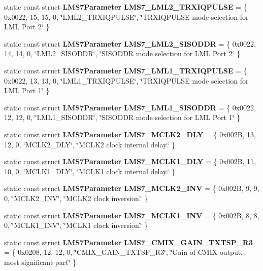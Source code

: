 \begin{DoxyCompactItemize}
\item 
static const struct {\bf L\+M\+S7\+Parameter} {\bf L\+M\+S7\+\_\+\+L\+M\+L2\+\_\+\+T\+R\+X\+I\+Q\+P\+U\+L\+SE} = \{ 0x0022, 15, 15, 0, \char`\"{}\+L\+M\+L2\+\_\+\+T\+R\+X\+I\+Q\+P\+U\+L\+S\+E\char`\"{}, \char`\"{}\+T\+R\+X\+I\+Q\+P\+U\+L\+S\+E mode selection for L\+M\+L Port 2\char`\"{} \}
\item 
static const struct {\bf L\+M\+S7\+Parameter} {\bf L\+M\+S7\+\_\+\+L\+M\+L2\+\_\+\+S\+I\+S\+O\+D\+DR} = \{ 0x0022, 14, 14, 0, \char`\"{}\+L\+M\+L2\+\_\+\+S\+I\+S\+O\+D\+D\+R\char`\"{}, \char`\"{}\+S\+I\+S\+O\+D\+D\+R mode selection for L\+M\+L Port 2\char`\"{} \}
\item 
static const struct {\bf L\+M\+S7\+Parameter} {\bf L\+M\+S7\+\_\+\+L\+M\+L1\+\_\+\+T\+R\+X\+I\+Q\+P\+U\+L\+SE} = \{ 0x0022, 13, 13, 0, \char`\"{}\+L\+M\+L1\+\_\+\+T\+R\+X\+I\+Q\+P\+U\+L\+S\+E\char`\"{}, \char`\"{}\+T\+R\+X\+I\+Q\+P\+U\+L\+S\+E mode selection for L\+M\+L Port 1\char`\"{} \}
\item 
static const struct {\bf L\+M\+S7\+Parameter} {\bf L\+M\+S7\+\_\+\+L\+M\+L1\+\_\+\+S\+I\+S\+O\+D\+DR} = \{ 0x0022, 12, 12, 0, \char`\"{}\+L\+M\+L1\+\_\+\+S\+I\+S\+O\+D\+D\+R\char`\"{}, \char`\"{}\+S\+I\+S\+O\+D\+D\+R mode selection for L\+M\+L Port 1\char`\"{} \}
\item 
static const struct {\bf L\+M\+S7\+Parameter} {\bf L\+M\+S7\+\_\+\+M\+C\+L\+K2\+\_\+\+D\+LY} = \{ 0x002\+B, 13, 12, 0, \char`\"{}\+M\+C\+L\+K2\+\_\+\+D\+L\+Y\char`\"{}, \char`\"{}\+M\+C\+L\+K2 clock internal delay.\char`\"{} \}
\item 
static const struct {\bf L\+M\+S7\+Parameter} {\bf L\+M\+S7\+\_\+\+M\+C\+L\+K1\+\_\+\+D\+LY} = \{ 0x002\+B, 11, 10, 0, \char`\"{}\+M\+C\+L\+K1\+\_\+\+D\+L\+Y\char`\"{}, \char`\"{}\+M\+C\+L\+K1 clock internal delay.\char`\"{} \}
\item 
static const struct {\bf L\+M\+S7\+Parameter} {\bf L\+M\+S7\+\_\+\+M\+C\+L\+K2\+\_\+\+I\+NV} = \{ 0x002\+B, 9, 9, 0, \char`\"{}\+M\+C\+L\+K2\+\_\+\+I\+N\+V\char`\"{}, \char`\"{}\+M\+C\+L\+K2 clock inversion.\char`\"{} \}
\item 
static const struct {\bf L\+M\+S7\+Parameter} {\bf L\+M\+S7\+\_\+\+M\+C\+L\+K1\+\_\+\+I\+NV} = \{ 0x002\+B, 8, 8, 0, \char`\"{}\+M\+C\+L\+K1\+\_\+\+I\+N\+V\char`\"{}, \char`\"{}\+M\+C\+L\+K1 clock inversion.\char`\"{} \}
\item 
static const struct {\bf L\+M\+S7\+Parameter} {\bf L\+M\+S7\+\_\+\+C\+M\+I\+X\+\_\+\+G\+A\+I\+N\+\_\+\+T\+X\+T\+S\+P\+\_\+\+R3} = \{ 0x0208, 12, 12, 0, \char`\"{}\+C\+M\+I\+X\+\_\+\+G\+A\+I\+N\+\_\+\+T\+X\+T\+S\+P\+\_\+\+R3\char`\"{}, \char`\"{}\+Gain of C\+M\+I\+X output, most significant part\char`\"{} \}

\end{DoxyCompactItemize}
